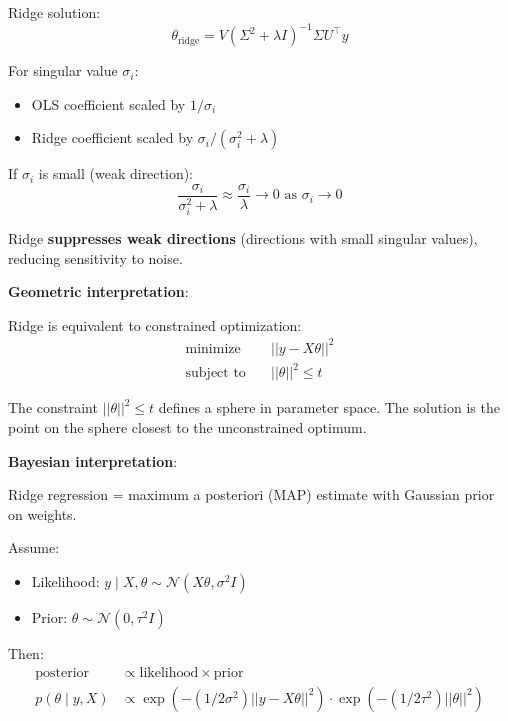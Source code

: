 \documentclass[11pt,oneside]{book}
\begin{document}
Ridge solution:
\begin{equation}
\theta_{\text{ridge}} = V(\Sigma^2 + \lambda I)^{-1}\Sigma U^\top y
\end{equation}

For singular value $\sigma_i$:
\begin{itemize}
    \item OLS coefficient scaled by $1/\sigma_i$
    \item Ridge coefficient scaled by $\sigma_i/(\sigma_i^2 + \lambda)$
\end{itemize}

If $\sigma_i$ is small (weak direction):
\begin{equation}
\frac{\sigma_i}{\sigma_i^2 + \lambda} \approx \frac{\sigma_i}{\lambda} \to 0 \text{ as } \sigma_i \to 0
\end{equation}

Ridge \textbf{suppresses weak directions} (directions with small singular values), reducing sensitivity to noise.

\textbf{Geometric interpretation}:

Ridge is equivalent to constrained optimization:
\begin{align}
\text{minimize} \quad & ||y - X\theta||^2 \\
\text{subject to} \quad & ||\theta||^2 \leq t
\end{align}

The constraint $||\theta||^2 \leq t$ defines a sphere in parameter space. The solution is the point on the sphere closest to the unconstrained optimum.

\textbf{Bayesian interpretation}:

Ridge regression = maximum a posteriori (MAP) estimate with Gaussian prior on weights.

Assume:
\begin{itemize}
    \item Likelihood: $y \mid X, \theta \sim \mathcal{N}(X\theta, \sigma^2 I)$
    \item Prior: $\theta \sim \mathcal{N}(0, \tau^2 I)$
\end{itemize}

Then:
\begin{align}
\text{posterior} &\propto \text{likelihood} \times \text{prior} \\
p(\theta \mid y, X) &\propto \exp(-(1/2\sigma^2)||y - X\theta||^2) \cdot \exp(-(1/2\tau^2)||\theta||^2)
\end{align}
\end{document}
